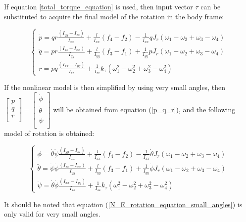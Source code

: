 \documentclass{thesisreport}
\begin{document}
If equation \ref{total_torque_equation} is used, then input vector $\tau$ can be substituted to acquire the final model of the rotation in the body frame:

\begin{equation}
\begin{cases}
\dot{p} = qr \frac{(I_{yy}-I_{zz})}{I_{xx}} + \frac{l}{I_{xx}}(f_4-f_2) - \frac{1}{I_{xx}}qJ_r (\omega_1 - \omega_2 + \omega_3 - \omega_4) \\
\dot{q} = pr \frac{(I_{zz}-I_{xx})}{I_{yy}} + \frac{l}{I_{yy}}(f_3-f_1) + \frac{1}{I_{yy}}pJ_r (\omega_1 - \omega_2 + \omega_3 - \omega_4) \\
\dot{r} = pq \frac{(I_{xx}-I_{yy})}{I_{zz}} + \frac{1}{I_{zz}} k_{\tau} (\omega_1^2 -\omega_2^2 + \omega_3^2 - \omega_4^2)
\end{cases}
\end{equation}

If the nonlinear model is then simplified by using very small angles, then $\begin{bmatrix}
p \\ 
q \\
r \\ 
\end{bmatrix} = \begin{bmatrix}
\dot{\phi} \\
\dot{\theta} \\
\dot{\psi} \\
\end{bmatrix}$ will be obtained from equation (\ref{p_q_r}), and the following model of rotation is obtained:

\begin{equation}\label{N_E_rotation_equation_small_angles}
\begin{cases}
\ddot{\phi} = \dot{\theta} \dot{\psi} \frac{(I_{yy}-I_{zz})}{I_{xx}} + \frac{l}{I_{xx}}(f_4-f_2) - \frac{1}{I_{xx}} \dot{\theta} J_r (\omega_1 - \omega_2 + \omega_3 - \omega_4) \\
\ddot{\theta} = \dot{\psi} \dot{\phi} \frac{(I_{zz}-I_{xx})}{I_{yy}} + \frac{l}{I_{yy}}(f_3-f_1) + \frac{1}{I_{yy}} \dot{\phi} J_r (\omega_1 - \omega_2 + \omega_3 - \omega_4) \\
\ddot{\psi} = \dot{\theta} \dot{\phi} \frac{(I_{xx}-I_{yy})}{I_{zz}} + \frac{1}{I_{zz}} k_{\tau} (\omega_1^2 -\omega_2^2 + \omega_3^2 - \omega_4^2)
\end{cases}
\end{equation}

It should be noted that equation (\ref{N_E_rotation_equation_small_angles}) is only valid for very small angles.
\end{document}
